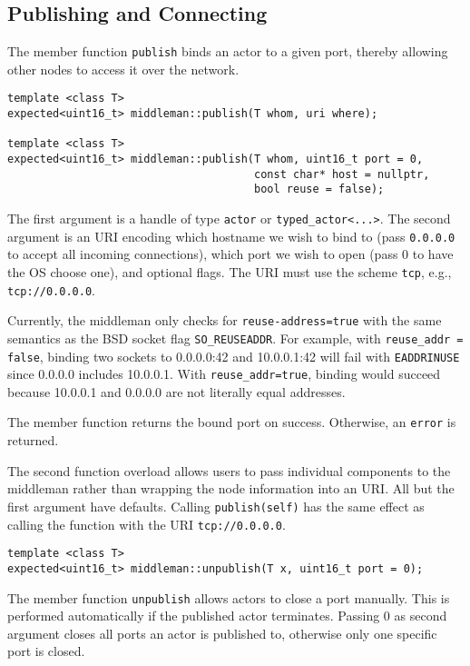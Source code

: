 \subsection{Publishing and Connecting}
\label{remoting}

The member function \lstinline^publish^ binds an actor to a given port, thereby
allowing other nodes to access it over the network.

\begin{lstlisting}
template <class T>
expected<uint16_t> middleman::publish(T whom, uri where);

template <class T>
expected<uint16_t> middleman::publish(T whom, uint16_t port = 0,
                                      const char* host = nullptr,
                                      bool reuse = false);
\end{lstlisting}

The first argument is a handle of type \lstinline^actor^ or
\lstinline^typed_actor<...>^. The second argument is an URI encoding which
hostname we wish to bind to (pass \lstinline^0.0.0.0^ to accept all incoming
connections), which port we wish to open (pass 0 to have the OS choose one),
and optional flags. The URI must use the scheme \lstinline^tcp^,
e.g., \lstinline^tcp://0.0.0.0^.

Currently, the middleman only checks for \lstinline^reuse-address=true^ with
the same semantics as the BSD socket flag \lstinline^SO_REUSEADDR^. For
example, with \lstinline^reuse_addr = false^, binding two sockets to 0.0.0.0:42
and 10.0.0.1:42 will fail with \texttt{EADDRINUSE} since 0.0.0.0 includes
10.0.0.1. With \lstinline^reuse_addr=true^, binding would succeed because
10.0.0.1 and 0.0.0.0 are not literally equal addresses.

The member function returns the bound port on success. Otherwise, an
\lstinline^error^  is returned.

The second function overload allows users to pass individual components to the
middleman rather than wrapping the node information into an URI. All but the
first argument have defaults. Calling \lstinline^publish(self)^ has the same
effect as calling the function with the URI \lstinline^tcp://0.0.0.0^.

\begin{lstlisting}
template <class T>
expected<uint16_t> middleman::unpublish(T x, uint16_t port = 0);
\end{lstlisting}

The member function \lstinline^unpublish^ allows actors to close a port
manually. This is performed automatically if the published actor terminates.
Passing 0 as second argument closes all ports an actor is published to,
otherwise only one specific port is closed.

